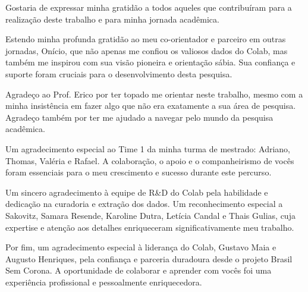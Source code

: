 Gostaria de expressar minha gratidão a todos aqueles que contribuíram para a realização deste trabalho e para minha jornada acadêmica.

Estendo minha profunda gratidão ao meu co-orientador e parceiro em outras jornadas, Onício, que não apenas me confiou os valiosos dados do Colab, mas também me inspirou com sua visão pioneira e orientação sábia. Sua confiança e suporte foram cruciais para o desenvolvimento desta pesquisa.

Agradeço ao Prof. Erico por ter topado me orientar neste trabalho, mesmo com a minha insistência em fazer algo que não era exatamente a sua área de pesquisa. Agradeço também por ter me ajudado a navegar pelo mundo da pesquisa acadêmica.

Um agradecimento especial ao Time 1 da minha turma de mestrado: Adriano, Thomas, Valéria e Rafael. A colaboração, o apoio e o companheirismo de vocês foram essenciais para o meu crescimento e sucesso durante este percurso.

Um sincero agradecimento à equipe de R\&D do Colab pela habilidade e dedicação na curadoria e extração dos dados. Um reconhecimento especial a Sakovitz, Samara Resende, Karoline Dutra, Letícia Candal e Thais Gulias, cuja expertise e atenção aos detalhes enriqueceram significativamente meu trabalho.

Por fim, um agradecimento especial à liderança do Colab, Gustavo Maia e Augusto Henriques, pela confiança e parceria duradoura desde o projeto Brasil Sem Corona. A oportunidade de colaborar e aprender com vocês foi uma experiência profissional e pessoalmente enriquecedora.